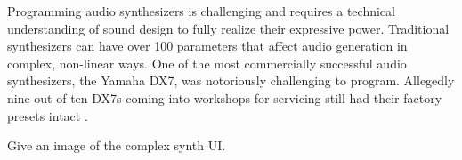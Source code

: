 Programming audio synthesizers is challenging and requires a technical understanding of sound design to fully realize their expressive power. Traditional synthesizers can have over 100 parameters that affect audio generation in complex, non-linear ways. One of the most commercially successful audio synthesizers, the Yamaha DX7, was notoriously challenging to program. Allegedly nine out of ten DX7s coming into workshops for servicing still had their factory presets intact \cite{seago2004critical}.

Give an image of the complex synth UI.




